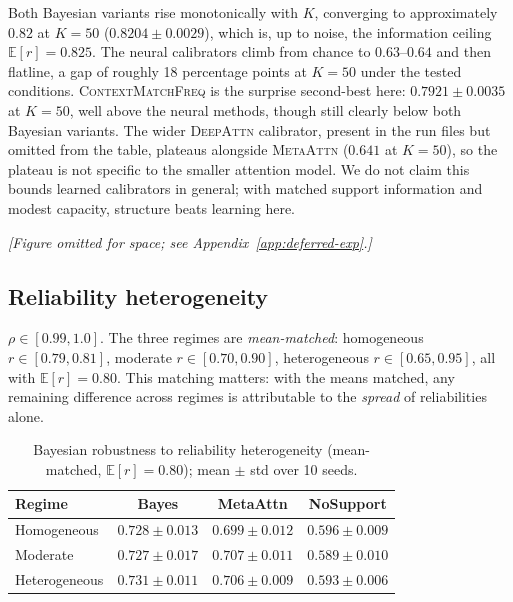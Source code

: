 Both Bayesian variants rise monotonically with $K$, converging to
approximately $0.82$ at $K=50$ ($0.8204 \pm 0.0029$), which is, up to
noise, the information ceiling $\mathbb{E}[r] = 0.825$. The neural
calibrators climb from chance to $0.63$--$0.64$ and then flatline, a gap
of roughly 18 percentage points at $K=50$ under the tested conditions.
\textsc{ContextMatchFreq} is the surprise second-best here: $0.7921 \pm
0.0035$ at $K=50$, well above the neural methods, though still clearly
below both Bayesian variants. The wider \textsc{DeepAttn} calibrator,
present in the run files but omitted from the table, plateaus alongside
\textsc{MetaAttn} ($0.641$ at $K=50$), so the plateau is not specific
to the smaller attention model. We do not claim this bounds learned
calibrators in general; with matched support information and modest
capacity, structure beats learning here.



\begin{center}
\emph{[Figure omitted for space; see Appendix~\ref{app:deferred-exp}.]}
\end{center}


\subsection{Reliability heterogeneity}

$\rho \in [0.99, 1.0]$. The three regimes are
\emph{mean-matched}: homogeneous $r \in [0.79, 0.81]$, moderate $r \in
[0.70, 0.90]$, heterogeneous $r \in [0.65, 0.95]$, all with
$\mathbb{E}[r] = 0.80$. This matching matters: with the means matched, any remaining difference across
regimes is attributable to the \emph{spread} of reliabilities alone.

\begin{table}[h]
\centering
\footnotesize
\caption{Bayesian robustness to reliability heterogeneity (mean-matched, $\mathbb{E}[r]=0.80$); mean $\pm$ std over 10 seeds.}
\label{tab:rel}
\begin{tabular}{lccc}
\toprule
Regime & Bayes & MetaAttn & NoSupport \\
\midrule
Homogeneous   & $\mathbf{0.728 \pm 0.013}$ & $0.699 \pm 0.012$ & $0.596 \pm 0.009$ \\
Moderate      & $\mathbf{0.727 \pm 0.017}$ & $0.707 \pm 0.011$ & $0.589 \pm 0.010$ \\
Heterogeneous & $\mathbf{0.731 \pm 0.011}$ & $0.706 \pm 0.009$ & $0.593 \pm 0.006$ \\
\bottomrule
\end{tabular}
\end{table}

